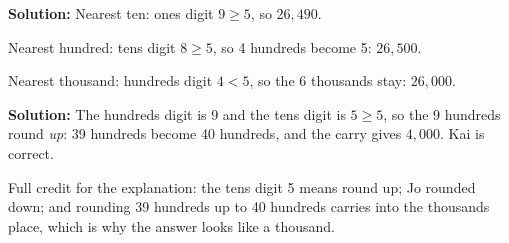 \documentclass[12pt]{article}
\begin{document}
\textbf{Solution:} Nearest ten: ones digit $9 \geq 5$, so $26{,}490$.

Nearest hundred: tens digit $8 \geq 5$, so 4 hundreds become 5: $26{,}500$.

Nearest thousand: hundreds digit $4 < 5$, so the 6 thousands stay: $26{,}000$.


\textbf{Solution:} The hundreds digit is 9 and the tens digit is $5 \geq 5$, so
the 9 hundreds round \emph{up}: 39 hundreds become 40 hundreds, and the carry
gives $4{,}000$. Kai is correct. 

Full credit for the explanation: the tens digit 5 means round up; Jo rounded
down; and rounding 39 hundreds up to 40 hundreds carries into the thousands
place, which is why the answer looks like a thousand.
\end{document}
